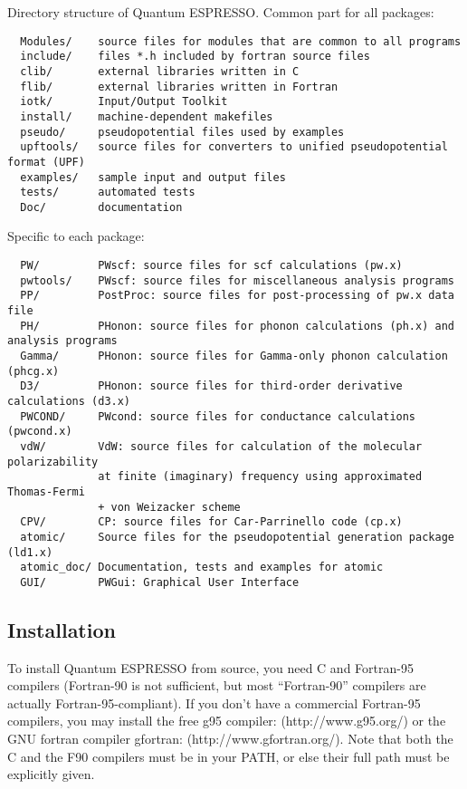 \documentclass[12pt,a4paper]{article}
\begin{document}
Directory structure of Quantum ESPRESSO. Common part for all packages:
\begin{verbatim}
  Modules/    source files for modules that are common to all programs
  include/    files *.h included by fortran source files
  clib/       external libraries written in C
  flib/       external libraries written in Fortran
  iotk/       Input/Output Toolkit
  install/    machine-dependent makefiles
  pseudo/     pseudopotential files used by examples
  upftools/   source files for converters to unified pseudopotential format (UPF)
  examples/   sample input and output files
  tests/      automated tests
  Doc/        documentation
\end{verbatim}
Specific to each package:
\begin{verbatim}
  PW/         PWscf: source files for scf calculations (pw.x)
  pwtools/    PWscf: source files for miscellaneous analysis programs
  PP/         PostProc: source files for post-processing of pw.x data file
  PH/         PHonon: source files for phonon calculations (ph.x) and analysis programs
  Gamma/      PHonon: source files for Gamma-only phonon calculation (phcg.x)
  D3/         PHonon: source files for third-order derivative calculations (d3.x)
  PWCOND/     PWcond: source files for conductance calculations (pwcond.x)
  vdW/        VdW: source files for calculation of the molecular polarizability
              at finite (imaginary) frequency using approximated Thomas-Fermi
              + von Weizacker scheme
  CPV/        CP: source files for Car-Parrinello code (cp.x)
  atomic/     Source files for the pseudopotential generation package (ld1.x)
  atomic_doc/ Documentation, tests and examples for atomic
  GUI/        PWGui: Graphical User Interface
\end{verbatim}

\subsection{Installation}

To install Quantum ESPRESSO from source, you need C and Fortran-95
compilers (Fortran-90 is not suﬃcient, but most “Fortran-90” compilers are
actually Fortran-95-compliant). If you don't have a commercial Fortran-95
compilers, you may install the free g95 compiler: (http://www.g95.org/) or
the GNU fortran compiler gfortran: (http://www.gfortran.org/).
Note that both the C and the F90 compilers must be in your PATH, or else
their full path must be explicitly given.
\end{document}
